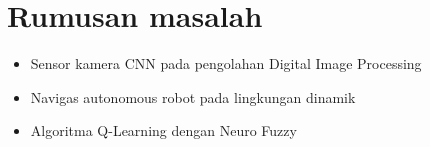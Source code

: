 





\section{Rumusan masalah}
\begin{itemize}
	\item Sensor kamera CNN pada pengolahan Digital Image Processing
	\item Navigas autonomous robot pada lingkungan dinamik
	\item Algoritma Q-Learning dengan Neuro Fuzzy
\end{itemize} 


